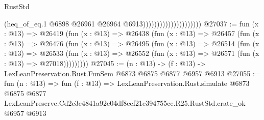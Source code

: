 \begin{lexlean}{RustStd}
\begin{coremodule}
                                            (heq_of_eq.{1}
                                              @6898
                                              @26961
                                              @26964
                                              @6913)))))))))))))))))))))
@27037 := fun (x : @13) =>
  @26419
    (fun (x : @13) =>
    @26438
      (fun (x : @13) =>
      @26457
        (fun (x : @13) =>
        @26476
          (fun (x : @13) =>
          @26495
            (fun (x : @13) =>
            @26514
              (fun (x : @13) =>
              @26533
                (fun (x : @13) => @26552 (fun (x : @13) => @26571 (fun (x : @13) => @27018)))))))))
@27045 := (n : @13) -> (f : @13) -> LexLeanPreservation.Rust.FunSem @6873 @6875 @6877 @6957 @6913
@27055 := fun (n : @13) =>
  fun (f : @13) =>
  LexLeanPreservation.Rust.simulate
    @6873
    @6875
    @6877
    LexLeanPreserve.Cd2c3e4841a92e04df8eef21e394755ce.R25.RustStd.crate_ok
    @6957
    @6913
\end{coremodule}
\end{lexlean}
